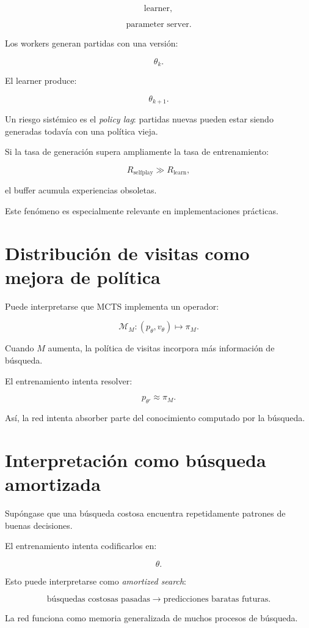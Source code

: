 \documentclass[11pt,a4paper]{article}
\begin{document}
\[
\text{learner},
\]

\[
\text{parameter server}.
\]

Los workers generan partidas con una versión:

\[
\theta_k.
\]

El learner produce:

\[
\theta_{k+1}.
\]

Un riesgo sistémico es el \emph{policy lag}: partidas nuevas pueden estar siendo generadas todavía con una política vieja.

Si la tasa de generación supera ampliamente la tasa de entrenamiento:

\[
R_{\mathrm{selfplay}}
\gg
R_{\mathrm{learn}},
\]

el buffer acumula experiencias obsoletas.

Este fenómeno es especialmente relevante en implementaciones prácticas.

\section{Distribución de visitas como mejora de política}

Puede interpretarse que MCTS implementa un operador:

\[
\mathcal{M}_M:
(p_\theta,v_\theta)
\mapsto
\pi_M.
\]

Cuando \(M\) aumenta, la política de visitas incorpora más información de búsqueda.

El entrenamiento intenta resolver:

\[
p_{\theta'}
\approx
\pi_M.
\]

Así, la red intenta absorber parte del conocimiento computado por la búsqueda.

\section{Interpretación como búsqueda amortizada}

Supóngase que una búsqueda costosa encuentra repetidamente patrones de buenas decisiones.

El entrenamiento intenta codificarlos en:

\[
\theta.
\]

Esto puede interpretarse como \emph{amortized search}:

\[
\text{búsquedas costosas pasadas}
\rightarrow
\text{predicciones baratas futuras}.
\]

La red funciona como memoria generalizada de muchos procesos de búsqueda.
\end{document}
